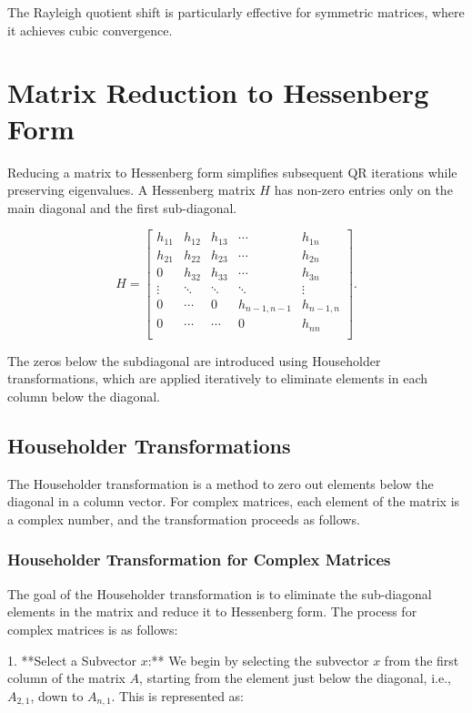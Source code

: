 \documentclass[12pt]{article}
\begin{document}
The Rayleigh quotient shift is particularly effective for symmetric matrices, where it achieves cubic convergence.

\section{Matrix Reduction to Hessenberg Form}
Reducing a matrix to Hessenberg form simplifies subsequent QR iterations while preserving eigenvalues. A Hessenberg matrix \(H\) has non-zero entries only on the main diagonal and the first sub-diagonal.


\[
H = 
\begin{bmatrix}
h_{11} & h_{12} & h_{13} & \cdots & h_{1n} \\
h_{21} & h_{22} & h_{23} & \cdots & h_{2n} \\
0      & h_{32} & h_{33} & \cdots & h_{3n} \\
\vdots & \ddots & \ddots & \ddots & \vdots \\
0      & \cdots & 0      & h_{n-1,n-1} & h_{n-1,n} \\
0      & \cdots & \cdots & 0          & h_{nn} \\
\end{bmatrix}.
\]

The zeros below the subdiagonal are introduced using Householder transformations, which are applied iteratively to eliminate elements in each column below the diagonal.


\subsection{Householder Transformations}
The Householder transformation is a method to zero out elements below the diagonal in a column vector. For complex matrices, each element of the matrix is a complex number, and the transformation proceeds as follows.

\subsubsection{Householder Transformation for Complex Matrices}
The goal of the Householder transformation is to eliminate the sub-diagonal elements in the matrix and reduce it to Hessenberg form. The process for complex matrices is as follows:

1. **Select a Subvector \( x \):**
   We begin by selecting the subvector \( x \) from the first column of the matrix \( A \), starting from the element just below the diagonal, i.e., \( A_{2,1} \), down to \( A_{n,1} \). This is represented as:
\end{document}
